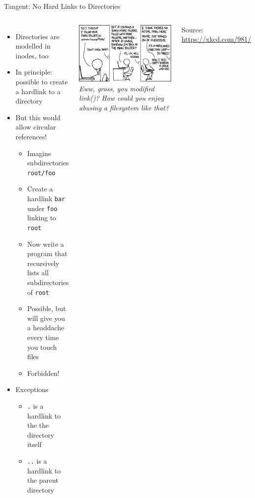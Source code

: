 \begin{frame}{Tangent: No Hard Links to Directories}
%
\begin{columns}
\begin{itemize}
\item Directories are modelled in inodes, too
\item In principle: possible to create a hardlink to a directory
\item But this would allow circular references!
	\begin{itemize}
	\item Imagine subdirectories \texttt{root/foo}
	\item Create a hardlink \texttt{bar} under \texttt{foo} linking to \texttt{root}
	\item Now write a program that recursively lists all subdirectories of \texttt{root}
	\item[\Thus] Possible, but will give you a headdache every time you touch files
	\item[\Thus] Forbidden!
	\end{itemize}
\item Exceptions
	\begin{itemize}
	\item \texttt{.} is a hardlink to the the directory itself
	\item \texttt{..} is a hardlink to the parent directory
	\end{itemize}
\end{itemize}
%
\includegraphics[width=\linewidth]{./gfx/14-xkcd-porn-folder}
\vspace{3pt}
\scriptsize
\emph{Eww, gross, you modified link()? How could you enjoy abusing a filesystem like that?}

\vspace{9pt}
Source: \url{https://xkcd.com/981/}
\end{columns}
%
\end{frame}

